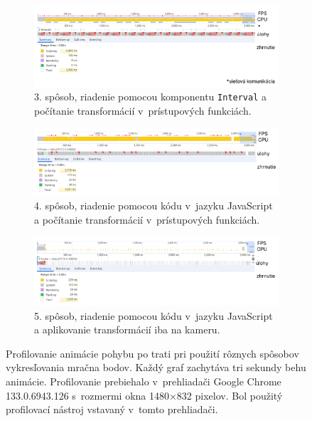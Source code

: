 \begin{figure}
    \centering
    \begin{subfigure}[b]{1\textwidth}
        \centering
        \includegraphics[width=1\linewidth]{text_prace/obrazky-figures/profiling_interval.pdf}
        \caption{3. spôsob, riadenie pomocou komponentu \texttt{Interval} a počítanie transformácií v~prístupových funkciách.}
        \label{fig:profiling_interval}
    \end{subfigure}
    \hfill
    \begin{subfigure}[b]{1\textwidth}
        \centering
        \includegraphics[width=1\linewidth]{text_prace/obrazky-figures/profiling1.pdf}
        \caption{4. spôsob, riadenie pomocou kódu v~jazyku JavaScript a počítanie transformácií v~prístupových funkciách.}
        \label{fig:profiling1}
    \end{subfigure}
    \hfill
    \begin{subfigure}[b]{1\textwidth}
        \centering
        \includegraphics[width=1\linewidth]{text_prace/obrazky-figures/profiling2.pdf}
        \caption{5. spôsob, riadenie pomocou kódu v~jazyku JavaScript a aplikovanie transformácií iba na kameru.}
        \label{fig:profiling2}
    \end{subfigure}
    \caption[Profilovanie animácie pohybu po trati pri použití rôznych spôsobov vykresľovania mračna bodov.]{Profilovanie animácie pohybu po trati pri použití rôznych spôsobov vykresľovania mračna bodov. Každý graf zachytáva tri sekundy behu animácie. Profilovanie prebiehalo v~prehliadači Google Chrome 133.0.6943.126 s~rozmermi okna 1480×832 pixelov. Bol použitý profilovací nástroj vstavaný v~tomto prehliadači.}
    \label{fig:profiling}
\end{figure}

